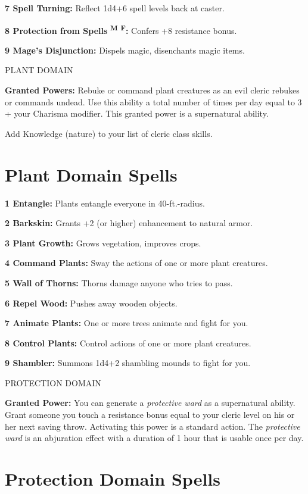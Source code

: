\documentclass{article}
\begin{document}
\textbf{7 Spell Turning: }Reflect 1d4+6 spell levels back at caster.

\textbf{8 Protection from Spells }\textsuperscript{\textbf{M}}{\scriptsize{}\textbf{ 
}}\textsuperscript{\textbf{F}}\textbf{: }Confers +8 resistance bonus.

\textbf{9 Mage's Disjunction: }Dispels magic, disenchants magic items.

PLANT DOMAIN

\textbf{Granted Powers:} Rebuke or command plant creatures as an evil cleric rebukes 
or commands undead. Use this ability a total number of times per day equal to 3 
+ your Charisma modifier. This granted power is a supernatural ability.

Add Knowledge (nature) to your list of cleric class skills.

\section*{\textbf{Plant Domain Spells}}

\textbf{1 Entangle: }Plants entangle everyone in 40-ft.-radius.

\textbf{2 Barkskin:} Grants +2 (or higher) enhancement to natural armor.

\textbf{3 Plant Growth: }Grows vegetation, improves crops.

\textbf{4 Command Plants:} Sway the actions of one or more plant creatures.

\textbf{5 Wall of Thorns: }Thorns damage anyone who tries to pass.

\textbf{6 Repel Wood:} Pushes away wooden objects.

\textbf{7 Animate Plants: }One or more trees animate and fight for you.

\textbf{8 Control Plants: }Control actions of one or more plant creatures.

\textbf{9 Shambler: }Summons 1d4+2 shambling mounds to fight for you.

\vspace{12pt}
PROTECTION DOMAIN

\textbf{Granted Power:} You can generate a \textit{protective ward }as a supernatural 
ability. Grant someone you touch a resistance bonus equal to your cleric level 
on his or her next saving throw. Activating this power is a standard action. The 
\textit{protective ward }is an abjuration effect with a duration of 1 hour that 
is usable once per day.

\section*{\textbf{Protection Domain Spells}}
\end{document}
